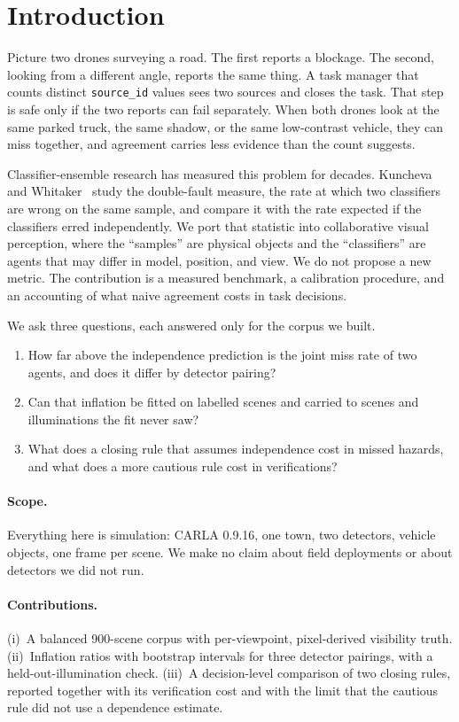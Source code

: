 \section{Introduction}

Picture two drones surveying a road. The first reports a blockage. The second,
looking from a different angle, reports the same thing. A task manager that
counts distinct \texttt{source\_id} values sees two sources and closes the
task. That step is safe only if the two reports can fail separately. When both
drones look at the same parked truck, the same shadow, or the same low-contrast
vehicle, they can miss together, and agreement carries less evidence than the
count suggests.

Classifier-ensemble research has measured this problem for decades. Kuncheva
and Whitaker~\cite{kuncheva2003} study the double-fault measure, the rate at
which two classifiers are wrong on the same sample, and compare it with the
rate expected if the classifiers erred independently. We port that statistic
into collaborative visual perception, where the ``samples'' are physical
objects and the ``classifiers'' are agents that may differ in model, position,
and view. We do not propose a new metric. The contribution is a measured
benchmark, a calibration procedure, and an accounting of what naive agreement
costs in task decisions.

We ask three questions, each answered only for the corpus we built.
\begin{enumerate}
  \item How far above the independence prediction is the joint miss rate of
        two agents, and does it differ by detector pairing?
  \item Can that inflation be fitted on labelled scenes and carried to scenes
        and illuminations the fit never saw?
  \item What does a closing rule that assumes independence cost in missed
        hazards, and what does a more cautious rule cost in verifications?
\end{enumerate}

\paragraph{Scope.} Everything here is simulation: CARLA 0.9.16, one town, two
detectors, vehicle objects, one frame per scene. We make no claim about field
deployments or about detectors we did not run.

\paragraph{Contributions.}
(i)~A balanced 900-scene corpus with per-viewpoint, pixel-derived visibility
truth. (ii)~Inflation ratios with bootstrap intervals for three detector
pairings, with a held-out-illumination check. (iii)~A decision-level comparison
of two closing rules, reported together with its verification cost and with the
limit that the cautious rule did not use a dependence estimate.

